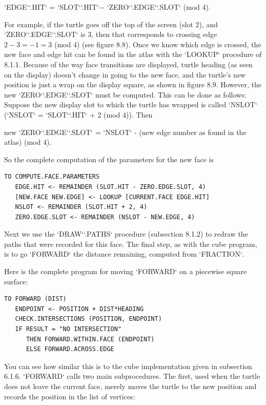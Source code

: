 \documentclass{book}
\begin{document}
\textsc{`EDGE`}\textsc{`.HIT`} = \textsc{`SLOT`}\textsc{`.HIT`}$ - $ \textsc{`ZERO`}\textsc{`.EDGE`}\textsc{`.SLOT`} (mod 4).

For example, if the turtle goes off the top of the screen (slot 2), and
\textsc{`ZERO`}\textsc{`.EDGE`}\textsc{`.SLOT`} is 3, then that corresponds to crossing edge $2 - 3 = -1 = 3$ (mod 4) (see figure 8.8). Once we know which edge is crossed,
the new face and edge hit can be found in the atlas with the \textsc{`LOOKUP`}
procedure of 8.1.1. Because of the way face transitions are displayed,
turtle heading (as seen on the display) doesn't change in going to the
new face, and the turtle's new position is just a wrap on the display
square, as shown in figure 8.9. However, the new \textsc{`ZERO`}\textsc{`.EDGE`}\textsc{`.SLOT`} must
be computed. This can be done as follows: Suppose the new display slot
to which the turtle has wrapped is called \textsc{`NSLOT`} (\textsc{`NSLOT`} = \textsc{`SLOT`}\textsc{`.HIT`} + 2
(mod 4)). Then

new \textsc{`ZERO`}\textsc{`.EDGE`}\textsc{`.SLOT`} = \textsc{`NSLOT`} - (new edge number as found in the atlas) (mod 4).

So the complete computation of the parameters for the new face is

\begin{verbatim}
TO COMPUTE.FACE.PARAMETERS
   EDGE.HIT <- REMAINDER (SLOT.HIT - ZERO.EDGE.SLOT, 4)
   [NEW.FACE NEW.EDGE] <- LOOKUP [CURRENT.FACE EDGE.HIT]
   NSLOT <- REMAINDER (SLOT.HIT + 2, 4)
   ZERO.EDGE.SLOT <- REMAINDER (NSLOT - NEW.EDGE, 4)
\end{verbatim}
Next we use the \textsc{`DRAW`}\textsc{`.PATHS`} procedure (subsection 8.1.2) to redraw
the paths that were recorded for this face. The final step, as with the
cube program, is to go \textsc{`FORWARD`} the distance remaining, computed from
\textsc{`FRACTION`}.

Here is the complete program for moving \textsc{`FORWARD`} on a piecewise
square surface:

\begin{verbatim}
TO FORWARD (DIST)
   ENDPOINT <- POSITION + DIST*HEADING
   CHECK.INTERSECTIONS (POSITION, ENDPOINT)
   IF RESULT = "NO INTERSECTION"
      THEN FORWARD.WITHIN.FACE (ENDPOINT)
      ELSE FORWARD.ACROSS.EDGE
\end{verbatim}
You can see how similar this is to the cube implementation given in
subsection 6.1.6. \textsc{`FORWARD`} calls two main subprocedures. The first, used
when the turtle does not leave the current face, merely moves the turtle
to the new position and records the position in the list of vertices:
\end{document}
